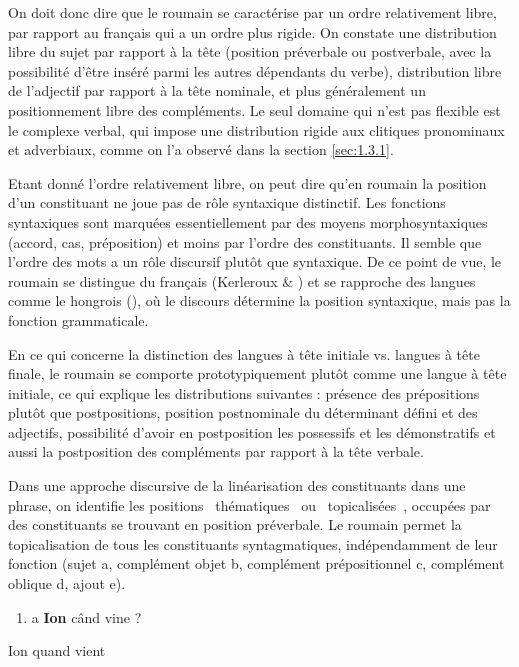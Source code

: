 On doit donc dire que le roumain se caractérise par un ordre relativement libre, par rapport au français qui a un ordre plus rigide. On constate une distribution libre du sujet par rapport à la tête (position préverbale ou postverbale, avec la possibilité d'être inséré parmi les autres dépendants du verbe), distribution libre de l'adjectif par rapport à la tête nominale, et plus généralement un positionnement libre des compléments. Le seul domaine qui n'est pas flexible est le complexe verbal, qui impose une distribution rigide aux clitiques pronominaux et adverbiaux, comme on l'a observé dans la section \ref{sec:1.3.1}.

Etant donné l'ordre relativement libre, on peut dire qu'en roumain la position d'un constituant ne joue pas de rôle syntaxique distinctif. Les fonctions syntaxiques sont marquées essentiellement par des moyens morphosyntaxiques (accord, cas, préposition) et moins par l'ordre des constituants. Il semble que l'ordre des mots a un rôle discursif plutôt que syntaxique. De ce point de vue, le roumain se distingue du français (Kerleroux \& \citet{Marandin2001}) et se rapproche des langues comme le hongrois (\citet{Kiss1995}), où le discours détermine la position syntaxique, mais pas la fonction grammaticale. 

En ce qui concerne la distinction des langues à tête initiale vs. langues à tête finale, le roumain se comporte prototypiquement plutôt comme une langue à tête initiale, ce qui explique les distributions suivantes : présence des prépositions plutôt que postpositions, position postnominale du déterminant défini et des adjectifs, possibilité d'avoir en postposition les possessifs et les démonstratifs et aussi la postposition des compléments par rapport à la tête verbale.

Dans une approche discursive de la linéarisation des constituants dans une phrase, on identifie les positions {\guillemotleft}~thématiques~{\guillemotright} ou {\guillemotleft}~topicalisées~{\guillemotright}, occupées par des constituants se trouvant en position préverbale. Le roumain permet la topicalisation de tous les constituants syntagmatiques, indépendamment de leur fonction (sujet a, complément objet b, complément prépositionnel c, complément oblique d, ajout e). 


\begin{enumerate}
\item \label{bkm:Ref299310131}a  \textbf{Ion}  când  vine ? 


\end{enumerate}
Ion  quand  vient


